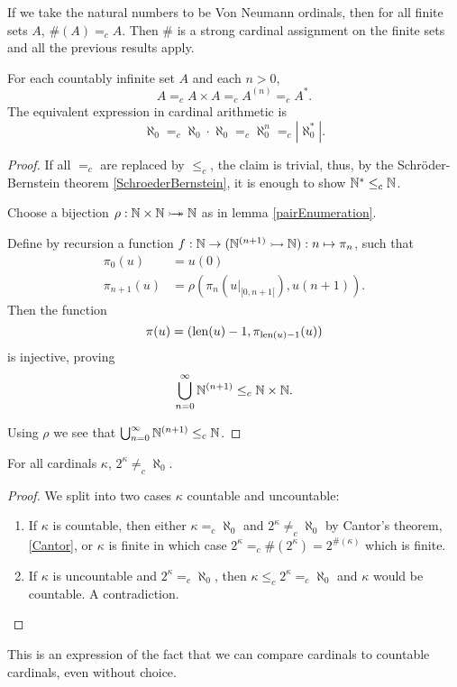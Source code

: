 If we take the natural numbers to be Von Neumann ordinals, then for all finite sets $A$, $\#(A) =_c A$. Then $\#$ is a strong cardinal assignment on the finite sets and all the previous results apply.


\begin{proposition}
For each countably infinite set $A$ and each $n>0$,
\[A =_c A\times A =_c A^{(n)} =_c A^*. \]
The equivalent expression in cardinal arithmetic is
\[ \aleph_0 =_c \aleph_0\cdot\aleph_0 =_c \aleph_0^n =_c |\aleph_0^*|. \]
\end{proposition}
\begin{proof}
If all $=_c$ are replaced by $\leq_c$, the claim is trivial, thus, by the Schröder-Bernstein theorem \ref{SchroederBernstein}, it is enough to show $\mathbb{N}^*\leq_c \mathbb{N}$.

Choose a bijection $\rho: \mathbb{N}\times\mathbb{N}\mathrel{\rightarrowtail\kern-1.9ex\twoheadrightarrow} \mathbb{N}$ as in lemma \ref{pairEnumeration}.

Define by recursion a function $f:\mathbb{N}\to (\mathbb{N}^{(n+1)}\rightarrowtail \mathbb{N}): n\mapsto \pi_n$, such that
\begin{align*}
\pi_0(u) &= u(0) \\
\pi_{n+1}(u) &= \rho(\pi_n(u|_{[0,n+1[}), u(n+1)).
\end{align*}
Then the function
\[ \pi(u) = (\operatorname{len}(u)-1, \pi_{\operatorname{len}(u)-1}(u)) \]
is injective, proving
\[ \bigcup_{n=0}^\infty \mathbb{N}^{(n+1)}\leq_c \mathbb{N}\times \mathbb{N}. \]

Using $\rho$ we see that $\bigcup_{n=0}^\infty \mathbb{N}^{(n+1)}\leq_c \mathbb{N}$.
\end{proof}

\begin{lemma}
For all cardinals $\kappa$, $2^\kappa \neq_c \aleph_0$.
\end{lemma}
\begin{proof}
We split into two cases $\kappa$ countable and uncountable:
\begin{enumerate}
\item If $\kappa$ is countable, then either $\kappa =_c \aleph_0$ and $2^\kappa \neq_c \aleph_0$ by Cantor's theorem, \ref{Cantor}, or $\kappa$ is finite in which case $2^\kappa =_c \#(2^{\kappa}) = 2^{\#(\kappa)}$ which is finite.
\item If $\kappa$ is uncountable and $2^\kappa =_c \aleph_0$, then $\kappa \leq_c 2^\kappa =_c \aleph_0$ and $\kappa$ would be countable. A contradiction.
\end{enumerate}
\end{proof}
This is an expression of the fact that we can compare cardinals to countable cardinals, even without choice.

